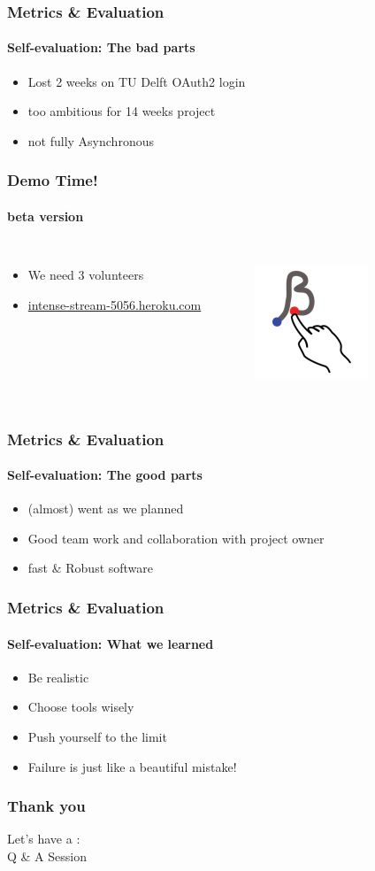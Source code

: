 \documentclass{beamer}
\begin{document}
\begin{frame}
\frametitle{Metrics \& Evaluation}
\framesubtitle{Self-evaluation: The bad parts}
	\begin{itemize}
	 \item Lost 2 weeks on TU Delft OAuth2 login
	 \item too ambitious for 14 weeks project
	 \item  not fully Asynchronous 
	\end{itemize}
\end{frame}
\begin{frame}
\frametitle{Demo Time!}
\framesubtitle{beta version}


\begin{columns}
\begin{itemize}
	\item We need 3 volunteers 
	\item \url{intense-stream-5056.heroku.com}
	
\end{itemize}
\begin{figure}%
    \centering
    \href{intense-stream-5056.heroku.com}{\includegraphics[scale=0.5]{./images/beta.png}}
\end{figure}		
\end{columns}

\end{frame}

\begin{frame}
\frametitle{Metrics \& Evaluation}
\framesubtitle{Self-evaluation: The good parts}
	\begin{itemize}
	 \item   (almost) went as we planned 
	 \item   Good team work and collaboration with project owner
	 \item   fast \& Robust software
	\end{itemize}
\end{frame}

\begin{frame}
\frametitle{Metrics \& Evaluation}
\framesubtitle{Self-evaluation: What we learned}
	\begin{itemize}
	 \item Be realistic 
	 \item Choose tools wisely
	 \item Push yourself to the limit
	 \item Failure is just like a beautiful mistake!
	\end{itemize}
\end{frame}

\begin{frame}
\frametitle{Thank you}
Let's have a : \\
\centering
\huge{Q \& A Session\\}



	
\end{frame}
\end{document}
